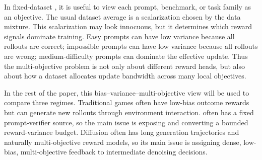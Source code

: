 \begin{discussionbox}[title={Discussion: Dataset RL as multi-objective RL}]
In fixed-dataset \llm{} \rlvr{}, it is useful to view each prompt, benchmark, or task family as an objective. The usual dataset average is a scalarization chosen by the data mixture. This scalarization may look innocuous, but it determines which reward signals dominate training. Easy prompts can have low variance because all rollouts are correct; impossible prompts can have low variance because all rollouts are wrong; medium-difficulty prompts can dominate the effective update. Thus the multi-objective problem is not only about different reward heads, but also about how a dataset allocates update bandwidth across many local objectives.
\end{discussionbox}

In the rest of the paper, this bias--variance--multi-objective view will be used to compare three regimes. Traditional games often have low-bias outcome rewards but can generate new rollouts through environment interaction. \llm{} \rlvr{} often has a fixed prompt-verifier source, so the main issue is exposing and converting a bounded reward-variance budget. Diffusion \rlvr{} often has long generation trajectories and naturally multi-objective reward models, so its main issue is assigning dense, low-bias, multi-objective feedback to intermediate denoising decisions.
